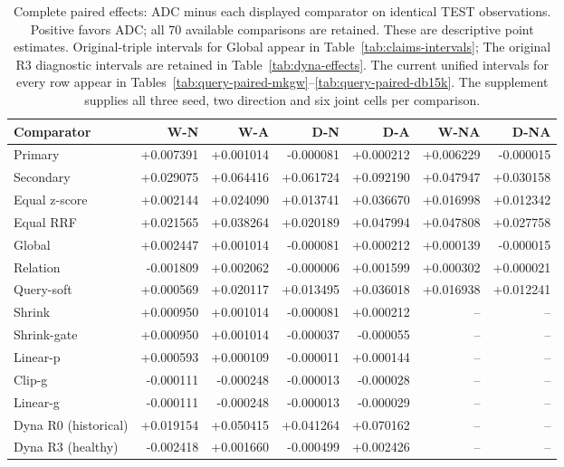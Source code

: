 \begin{table}[htbp]
\centering\footnotesize\setlength{\tabcolsep}{3pt}
\caption{Complete paired effects: ADC minus each displayed comparator on identical TEST observations. Positive favors ADC; all 70 available comparisons are retained. These are descriptive point estimates. Original-triple intervals for Global appear in Table~\ref{tab:claims-intervals}; The original R3 diagnostic intervals are retained in Table~\ref{tab:dyna-effects}. The current unified intervals for every row appear in Tables~\ref{tab:query-paired-mkgw}--\ref{tab:query-paired-db15k}. The supplement supplies all three seed, two direction and six joint cells per comparison.}
\label{tab:claims-paired}
\begin{tabular}{lrrrr|rr}
\toprule
Comparator & W-N & W-A & D-N & D-A & W-NA & D-NA\\
\midrule
Primary & +0.007391 & +0.001014 & -0.000081 & +0.000212 & +0.006229 & -0.000015\\
Secondary & +0.029075 & +0.064416 & +0.061724 & +0.092190 & +0.047947 & +0.030158\\
Equal z-score & +0.002144 & +0.024090 & +0.013741 & +0.036670 & +0.016998 & +0.012342\\
Equal RRF & +0.021565 & +0.038264 & +0.020189 & +0.047994 & +0.047808 & +0.027758\\
Global & +0.002447 & +0.001014 & -0.000081 & +0.000212 & +0.000139 & -0.000015\\
Relation & -0.001809 & +0.002062 & -0.000006 & +0.001599 & +0.000302 & +0.000021\\
Query-soft & +0.000569 & +0.020117 & +0.013495 & +0.036018 & +0.016938 & +0.012241\\
Shrink & +0.000950 & +0.001014 & -0.000081 & +0.000212 & -- & --\\
Shrink-gate & +0.000950 & +0.001014 & -0.000037 & -0.000055 & -- & --\\
Linear-p & +0.000593 & +0.000109 & -0.000011 & +0.000144 & -- & --\\
Clip-g & -0.000111 & -0.000248 & -0.000013 & -0.000028 & -- & --\\
Linear-g & -0.000111 & -0.000248 & -0.000013 & -0.000029 & -- & --\\
Dyna R0 (historical) & +0.019154 & +0.050415 & +0.041264 & +0.070162 & -- & --\\
Dyna R3 (healthy) & -0.002418 & +0.001660 & -0.000499 & +0.002426 & -- & --\\
\bottomrule
\end{tabular}
\end{table}
